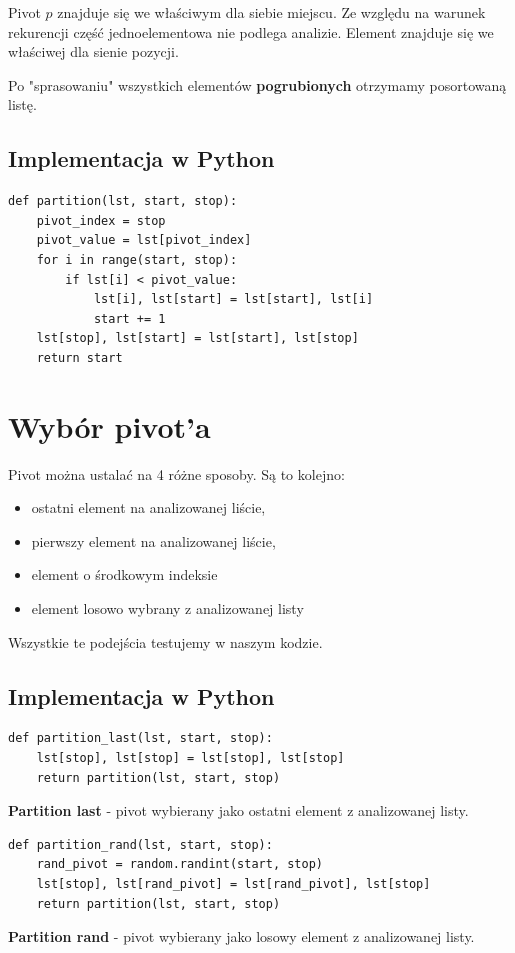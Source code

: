 \documentclass[a4paper,11pt]{report}
\begin{document}
Pivot $p$ znajduje się we właściwym dla siebie miejscu. Ze względu na warunek rekurencji część jednoelementowa nie podlega analizie. Element znajduje się we właściwej dla sienie pozycji.


Po "sprasowaniu" wszystkich elementów \textbf{pogrubionych} otrzymamy posortowaną listę.

\subsection{Implementacja w Python}

\begin{verbatim}
def partition(lst, start, stop):
    pivot_index = stop
    pivot_value = lst[pivot_index]
    for i in range(start, stop):
        if lst[i] < pivot_value:
            lst[i], lst[start] = lst[start], lst[i]
            start += 1
    lst[stop], lst[start] = lst[start], lst[stop]
    return start
\end{verbatim}


\section{Wybór pivot'a}
Pivot można ustalać na 4 różne sposoby. Są to kolejno:
\begin{itemize}
\item ostatni element na analizowanej liście,
\item pierwszy element na analizowanej liście, 
\item element o środkowym indeksie
\item element losowo wybrany z analizowanej listy
\end{itemize} 
Wszystkie te podejścia testujemy w naszym kodzie.

\subsection{Implementacja w Python}

\begin{verbatim}
def partition_last(lst, start, stop):
    lst[stop], lst[stop] = lst[stop], lst[stop]
    return partition(lst, start, stop)
\end{verbatim}
\textbf{Partition last} - pivot wybierany jako ostatni element z analizowanej listy.

\begin{verbatim}
def partition_rand(lst, start, stop):
    rand_pivot = random.randint(start, stop)
    lst[stop], lst[rand_pivot] = lst[rand_pivot], lst[stop]
    return partition(lst, start, stop)
\end{verbatim}
\textbf{Partition rand} - pivot wybierany jako losowy element z analizowanej listy.
\end{document}
